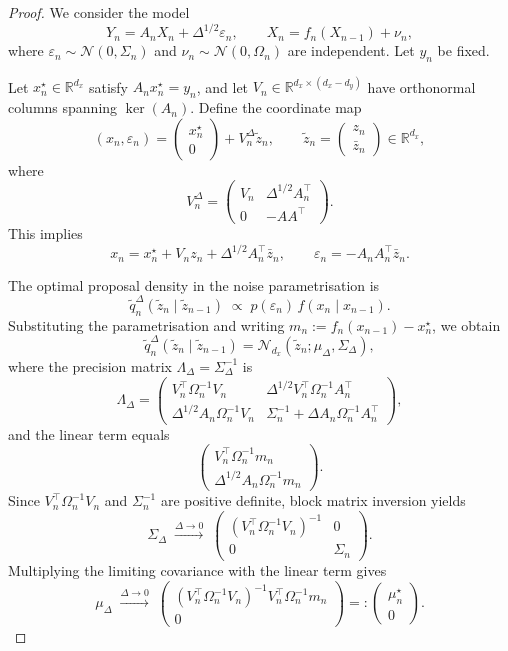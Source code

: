 \documentclass[english,13pt]{article}
\numberwithin{equation}{section}
\begin{document}
\begin{proof}

We consider the model
\[
Y_n = A_n X_n + \Delta^{1/2}\varepsilon_n,
\qquad
X_n = f_n(X_{n-1}) + \nu_n,
\]
where $\varepsilon_n \sim \mathcal N(0,\Sigma_n)$ and $\nu_n \sim \mathcal N(0,\Omega_n)$ are independent.
Let $y_n$ be fixed.

Let $x_n^\star \in \mathbb R^{d_x}$ satisfy $A_n x_n^\star = y_n$, and let
$V_n \in \mathbb R^{d_x \times (d_x-d_y)}$ have orthonormal columns spanning $\ker(A_n)$.
Define the coordinate map
\[
(x_n,\varepsilon_n)
=
\begin{pmatrix}
x_n^\star \\ 0
\end{pmatrix}
+
V_n^\Delta
\tilde z_n,
\qquad
\tilde z_n =
\begin{pmatrix}
z_n \\ \bar z_n
\end{pmatrix}
\in \mathbb R^{d_x},
\]
where
\[
V_n^\Delta =
\begin{pmatrix}
V_n & \Delta^{1/2} A_n^\top \\
0 & - A A^\top%
\end{pmatrix}.
\]
This implies
\[
x_n = x_n^\star + V_n z_n + \Delta^{1/2}A_n^\top \bar z_n,
\qquad
\varepsilon_n = - A_n A_n^\top \bar z_n.
\]

The optimal proposal density in the noise parametrisation is
\[
\tilde q_n^\Delta(\tilde z_n \mid \tilde z_{n-1})
\;\propto\;
p(\varepsilon_n)\, f(x_n \mid x_{n-1}).
\]
Substituting the parametrisation and writing
$m_n := f_n(x_{n-1}) - x_n^\star$, we obtain
\[
\tilde q_n^\Delta(\tilde z_n \mid \tilde z_{n-1})
=
\mathcal N_{d_x}(\tilde z_n;\mu_\Delta,\Sigma_\Delta),
\]
where the precision matrix $\Lambda_\Delta = \Sigma_\Delta^{-1}$ is
\[
\Lambda_\Delta =
\begin{pmatrix}
V_n^\top\Omega_n^{-1}V_n
&
\Delta^{1/2}V_n^\top\Omega_n^{-1}A_n^\top
\\[1mm]
\Delta^{1/2}A_n\Omega_n^{-1}V_n
&
\Sigma_n^{-1} + \Delta A_n\Omega_n^{-1}A_n^\top
\end{pmatrix},
\]
and the linear term equals
\[
\begin{pmatrix}
V_n^\top\Omega_n^{-1}m_n
\\[1mm]
\Delta^{1/2}A_n\Omega_n^{-1}m_n
\end{pmatrix}.
\]
Since $V_n^\top\Omega_n^{-1}V_n$ and $\Sigma_n^{-1}$ are positive definite,
block matrix inversion yields
\[
\Sigma_\Delta
\;\xrightarrow{\Delta \to 0}\;
\begin{pmatrix}
(V_n^\top\Omega_n^{-1}V_n)^{-1} & 0
\\[1mm]
0 & \Sigma_n
\end{pmatrix}.
\]
Multiplying the limiting covariance with the linear term gives
\[
\mu_\Delta
\;\xrightarrow{\Delta \to 0}\;
\begin{pmatrix}
(V_n^\top\Omega_n^{-1}V_n)^{-1}V_n^\top\Omega_n^{-1}m_n
\\[1mm]
0
\end{pmatrix}
=: \begin{pmatrix} \mu_n^\star \\ 0 \end{pmatrix}.
\]


\end{proof}
\end{document}

